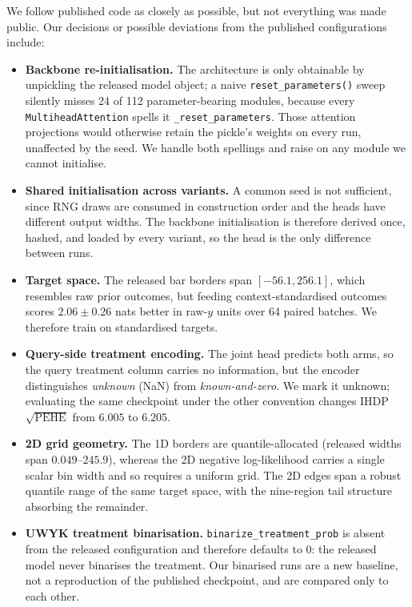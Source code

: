 We follow published code as closely as possible, but not everything was made
public. Our decisions or possible deviations from the published configurations
include:
\begin{itemize}
  \item \textbf{Backbone re-initialisation.} The architecture is only
        obtainable by unpickling the released model object; a naive
        \texttt{reset\_parameters()} sweep silently misses 24 of 112
        parameter-bearing modules, because every \texttt{MultiheadAttention}
        spells it \texttt{\_reset\_parameters}. Those attention projections
        would otherwise retain the pickle's weights on every run, unaffected by
        the seed. We handle both spellings and raise on any module we cannot
        initialise.
  \item \textbf{Shared initialisation across variants.} A common seed is not
        sufficient, since RNG draws are consumed in construction order and the
        heads have different output widths. The backbone initialisation is
        therefore derived once, hashed, and loaded by every variant, so the
        head is the only difference between runs.
  \item \textbf{Target space.} The released bar borders span $[-56.1, 256.1]$,
        which resembles raw prior outcomes, but feeding context-standardised
        outcomes scores $2.06 \pm 0.26$ nats better in raw-$y$ units over 64
        paired batches. We therefore train on standardised targets.
  \item \textbf{Query-side treatment encoding.} The joint head predicts both
        arms, so the query treatment column carries no information, but the
        encoder distinguishes \emph{unknown} (NaN) from \emph{known-and-zero}.
        We mark it unknown; evaluating the same checkpoint under the other
        convention changes IHDP $\sqrt{\mathrm{PEHE}}$ from $6.005$ to $6.205$.
  \item \textbf{2D grid geometry.} The 1D borders are quantile-allocated
        (released widths span $0.049$--$245.9$), whereas the 2D negative
        log-likelihood carries a single scalar bin width and so requires a
        uniform grid. The 2D edges span a robust quantile range of the same
        target space, with the nine-region tail structure absorbing the
        remainder.
  \item \textbf{UWYK treatment binarisation.} \texttt{binarize\_treatment\_prob}
        is absent from the released configuration and therefore defaults to
        $0$: the released model never binarises the treatment. Our binarised
        runs are a new baseline, not a reproduction of the published
        checkpoint, and are compared only to each other.
\end{itemize}

